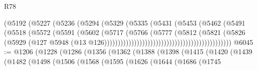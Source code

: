 \begin{lexlean}{R78}
\begin{coremodule}
                                                    (@5192
                                                      (@5227
                                                        (@5236
                                                          (@5294
                                                            (@5329
                                                              (@5335
                                                                (@5431
                                                                  (@5453
                                                                    (@5462
                                                                      (@5491
                                                                        (@5518
                                                                          (@5572
                                                                            (@5591
                                                                              (@5602
                                                                                (@5717
                                                                                  (@5766
                                                                                    (@5777
                                                                                      (@5812
                                                                                        (@5821
                                                                                          (@5826
                                                                                            (@5929
                                                                                              (@127
                                                                                                @5948
                                                                                                (@13
                                                                                                  @126)))))))))))))))))))))))))))))))))))))))))))))))
@6045 := @1206
    (@1228
      (@1286
        (@1356
          (@1362
            (@1388
              (@1398
                (@1415
                  (@1420
                    (@1439
                      (@1482
                        (@1498
                          (@1506
                            (@1568
                              (@1595
                                (@1626
                                  (@1644
                                    (@1686
                                      (@1745

\end{coremodule}
\end{lexlean}
